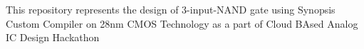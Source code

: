 
This repository represents the design of 3-input-NAND gate using Synopsis Custom Compiler on 28nm CMOS Technology as a part of Cloud BAsed Analog IC Design Hackathon 
